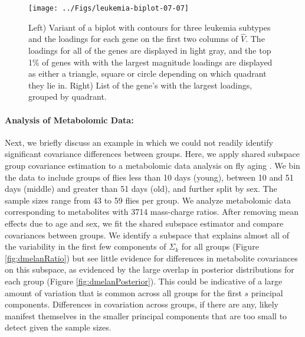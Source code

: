 \documentclass{statsoc}
\begin{document}
  \begin{figure}[!ht]
    \centering
    \texttt{[image: ../Figs/leukemia-biplot-07-07]}
    \qquad
\raisebox{1\height}{
\scriptsize

}
\caption{Left) Variant of a biplot with contours for three leukemia
  subtypes and the loadings for each gene on the first two columns of
  $\hat{V}$.  The loadings for all of the genes are displayed in light gray, and the
  top 1\% of genes with with the largest magnitude loadings are
  displayed as either a triangle, square or circle depending on which
  quadrant they lie in.  Right) List of the gene's with the largest
  loadings, grouped by quadrant.}
\label{fig:leukemiaBiplot}
\end{figure}
\paragraph{Analysis of Metabolomic Data:} Next, we briefly discuss an
example in which we could not readily identify significant covariance
differences between groups.  Here, we apply shared subspace group
covariance estimation to a metabolomic data analysis on fly aging
\citep{Hoffman2014}.  We bin the data to include groups of flies less
than 10 days (young), between 10 and 51 days (middle) and greater than
51 days (old), and further split by sex. The sample sizes range from
43 to 59 flies per group.  We analyze metabolomic data corresponding
to metabolites with 3714 mass-charge ratios.  After removing mean
effects due to age and sex, we fit the shared subspace estimator and
compare covariances between groups.  We identify a subspace that
explains almost all of the variability in the first few components of
$\Sigma_k$ for all groups (Figure \ref{fig:dmelanRatio}) but see
little evidence for differences in metabolite covariances on this
subspace, as evidenced by the large overlap in posterior distributions
for each group (Figure \ref{fig:dmelanPosterior}). This could be
indicative of a large amount of variation that is common across all
groups for the first $s$ principal components. Differences in
covariation across groups, if there are any, likely manifest
themselves in the smaller principal components that are too small to
detect given the sample sizes.
\end{document}
